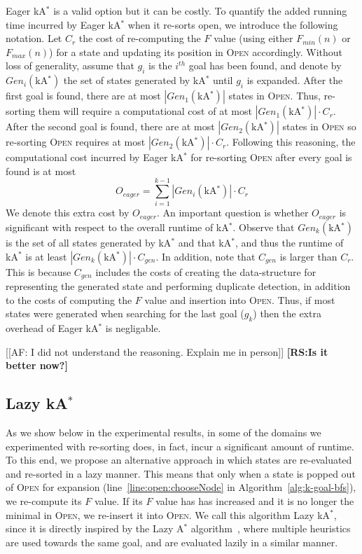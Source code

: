 \documentclass{aicom2e}
\newcommand{\astar}{A$^*$}
\newcommand{\kastar}{kA$^*$}
\newcommand{\minf}{$F_{min}(n)$}
\newcommand{\maxf}{$F_{max}(n)$}
\newcommand{\open}{\textsc{Open}}
\newcommand{\roni}[1]{\textbf{[RS:#1]}}
\begin{document}
Eager \kastar{} is a valid option but it can be costly. To quantify the added running time 
incurred by Eager \kastar{} when it re-sorts open, we introduce the following notation. 
Let $C_r$ the cost of re-computing the $F$ value (using either \minf{} or \maxf{}) for a state and updating its position in \open{} accordingly. Without loss of generality, assume that $g_i$ is the  $i^{th}$ goal has been found, and denote by $Gen_i(\text{\kastar{}})$ the set of  states generated by \kastar{} until $g_i$ is expanded. After the first goal is found, there are at most $|Gen_1(\text{\kastar{}})|$ states in \open{}. Thus, re-sorting them will require a computational cost of at most $|Gen_1(\text{\kastar{}})|\cdot C_r$. After the second goal is found, there
are at most $|Gen_2(\text{\kastar{}})|$ states in \open{} so re-sorting \open{} requires at most
$|Gen_2(\text{\kastar{}})|\cdot C_r$. Following this reasoning, the computational
cost incurred by Eager \kastar{} for re-sorting \open{} after every goal is found is at most
\begin{equation}
O_{eager}=\sum_{i=1}^{k-1} |Gen_i(\text{\kastar{}})|\cdot C_r
\label{eq:re-sort-cost}
\end{equation}
We denote this extra cost by $O_{eager}$. 
An important question is whether $O_{eager}$ is significant with respect to the overall runtime of \kastar{}. Observe that $Gen_k(\text{\kastar{}})$ is the set of all states generated by \kastar{} 
and that \kastar{}, and thus the runtime of \kastar{} is at least 
$|Gen_k(\text{\kastar{}})|\cdot C_{gen}$. 
In addition, note that $C_{gen}$ is larger than $C_r$. 
This is because $C_{gen}$ includes the costs of creating the data-structure for representing the generated state and performing duplicate detection, 
in addition to the costs of computing the $F$ value and insertion into \open{}. 
Thus, if most states were generated when searching for the last goal ($g_k$) 
then the extra overhead of Eager \kastar{} is negligable. 

[[AF: I did not understand the reasoning. Explain me in person]]
\roni{Is it better now?}


\subsection{Lazy \kastar{}}

As we show below in the experimental results, in some of the domains we experimented with re-sorting does, in fact, incur a significant amount of runtime. 
To this end, we propose an alternative approach 
in which states are re-evaluated and re-sorted in a lazy manner. This means
that only when a state is popped out of \open{} for expansion
(line~\ref{line:open:chooseNode} in Algorithm~\ref{alg:k-goal-bfs}), we
re-compute its $F$ value. If its $F$ value has has increased and it is no
longer the minimal in \open, we re-insert it into \open{}. We call this
algorithm Lazy \kastar{}, since it is directly inspired by the Lazy \astar{}
algorithm~\cite{betzalel2015typeSystem,tolpin2013toward}, where multiple
heuristics are used towards the same goal, and are evaluated lazily in a
similar manner.
\end{document}
